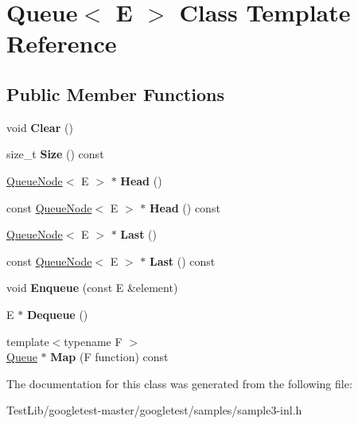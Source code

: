 \hypertarget{classQueue}{}\section{Queue$<$ E $>$ Class Template Reference}
\label{classQueue}
\subsection*{Public Member Functions}
\begin{DoxyCompactItemize}
\item 
\mbox{\label{classQueue_acfdd5f9f7e936ca30dcf877370ef9510}} 
void {\bfseries Clear} ()
\item 
\mbox{\label{classQueue_abc4d78b5f66041011c5590bf703847b0}} 
size\+\_\+t {\bfseries Size} () const
\item 
\mbox{\label{classQueue_a71aa0154ef75bb87a53b6af1829fcd5e}} 
\hyperlink{classQueueNode}{Queue\+Node}$<$ E $>$ $\ast$ {\bfseries Head} ()
\item 
\mbox{\label{classQueue_a6c906075e0ad2d1f0634990aa106395e}} 
const \hyperlink{classQueueNode}{Queue\+Node}$<$ E $>$ $\ast$ {\bfseries Head} () const
\item 
\mbox{\label{classQueue_a430aca3d3b9f5fd588b215028d134b74}} 
\hyperlink{classQueueNode}{Queue\+Node}$<$ E $>$ $\ast$ {\bfseries Last} ()
\item 
\mbox{\label{classQueue_a7c8c2c64700dfe1df8bf266572cf101a}} 
const \hyperlink{classQueueNode}{Queue\+Node}$<$ E $>$ $\ast$ {\bfseries Last} () const
\item 
\mbox{\label{classQueue_abaa2e7175457307bca74f5562cbdaaa9}} 
void {\bfseries Enqueue} (const E \&element)
\item 
\mbox{\label{classQueue_a434d465001c3078e999f7a89a8af84c0}} 
E $\ast$ {\bfseries Dequeue} ()
\item 
\mbox{\label{classQueue_a904a696292fc593adc6fd21fb229d760}} 
{\footnotesize template$<$typename F $>$ }\\\hyperlink{classQueue}{Queue} $\ast$ {\bfseries Map} (F function) const
\end{DoxyCompactItemize}


The documentation for this class was generated from the following file\+:\begin{DoxyCompactItemize}
\item 
Test\+Lib/googletest-\/master/googletest/samples/sample3-\/inl.\+h\end{DoxyCompactItemize}
